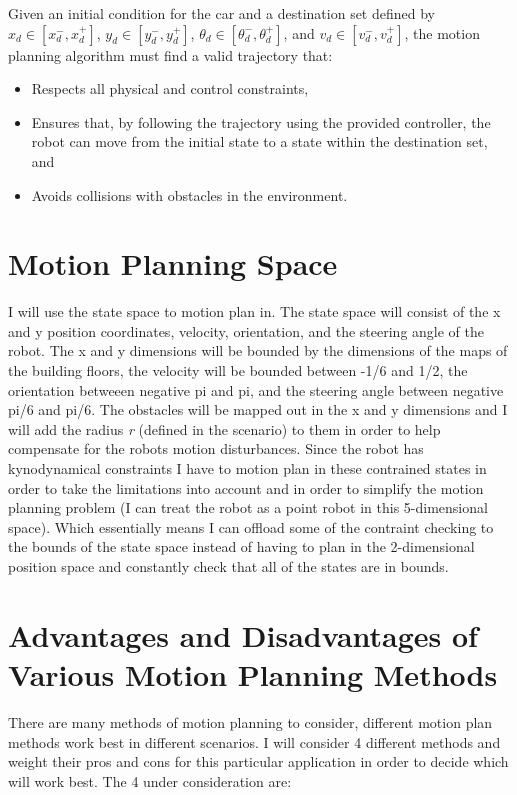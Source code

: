 \documentclass{article}
\begin{document}
Given an initial condition for the car and a destination set defined by \(x_d \in [x_d^-, x_d^+]\), \(y_d \in [y_d^-, y_d^+]\), \(\theta_d \in [\theta_d^-, \theta_d^+]\), and \(v_d \in [v_d^-, v_d^+]\), the motion planning algorithm must find a valid trajectory that:
\begin{itemize}
    \item Respects all physical and control constraints,
    \item Ensures that, by following the trajectory using the provided controller, the robot can move from the initial state to a state within the destination set, and
    \item Avoids collisions with obstacles in the environment.
\end{itemize}

\section{Motion Planning Space}

I will use the state space to motion plan in. The state space will consist of the x and y position coordinates, velocity, orientation, and the steering angle of the robot.
The x and y dimensions will be bounded by the dimensions of the maps of the building floors, the velocity will be bounded between -1/6 and 1/2, the orientation betweeen negative pi and pi, and the steering angle between negative pi/6 and pi/6.
The obstacles will be mapped out in the x and y dimensions and I will add the radius \textit{r} (defined in the scenario) to them in order to help compensate for the robots motion disturbances.
Since the robot has kynodynamical constraints I have to motion plan in these contrained states in order to take the limitations into account and in order to simplify the motion planning problem (I can treat the robot as a point robot in this 5-dimensional space).
Which essentially means I can offload some of the contraint checking to the bounds of the state space instead of having to plan in the 2-dimensional position space and constantly check that all of the states are in bounds.

\section{Advantages and Disadvantages of Various Motion Planning Methods}

There are many methods of motion planning to consider, different motion plan methods work best in different scenarios.
I will consider 4 different methods and weight their pros and cons for this particular application in order to decide which will work best.
The 4 under consideration are:
\end{document}
